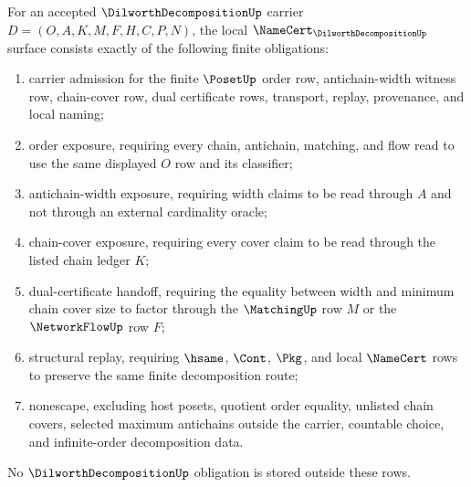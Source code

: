 \begin{theorem}
\label{thm:dilworth-decomposition-namecert-obligations}
For an accepted $\DilworthDecompositionUp$ carrier $D=(O,A,K,M,F,H,C,P,N)$, the local $\NameCert_{\DilworthDecompositionUp}$ surface consists exactly of the following finite obligations:
\begin{enumerate}
\item carrier admission for the finite $\PosetUp$ order row, antichain-width witness row, chain-cover row, dual certificate rows, transport, replay, provenance, and local naming;
\item order exposure, requiring every chain, antichain, matching, and flow read to use the same displayed $O$ row and its classifier;
\item antichain-width exposure, requiring width claims to be read through $A$ and not through an external cardinality oracle;
\item chain-cover exposure, requiring every cover claim to be read through the listed chain ledger $K$;
\item dual-certificate handoff, requiring the equality between width and minimum chain cover size to factor through the $\MatchingUp$ row $M$ or the $\NetworkFlowUp$ row $F$;
\item structural replay, requiring $\hsame$, $\Cont$, $\Pkg$, and local $\NameCert$ rows to preserve the same finite decomposition route;
\item nonescape, excluding host posets, quotient order equality, unlisted chain covers, selected maximum antichains outside the carrier, countable choice, and infinite-order decomposition data.
\end{enumerate}
No $\DilworthDecompositionUp$ obligation is stored outside these rows.
\end{theorem}
